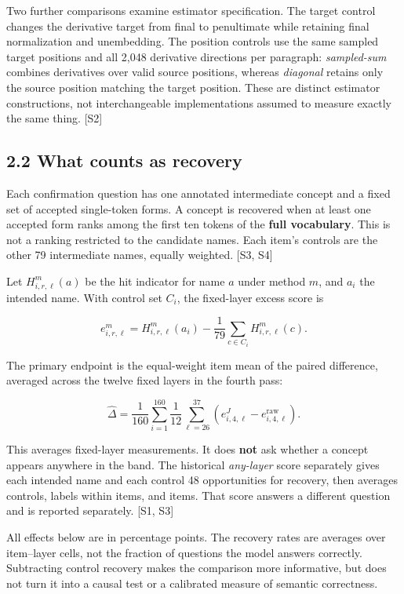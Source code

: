 \documentclass[
  11pt,
  a4paper,
]{article}
\begin{document}
Two further comparisons examine estimator specification. The target
control changes the derivative target from final to penultimate while
retaining final normalization and unembedding. The position controls use
the same sampled target positions and all 2,048 derivative directions
per paragraph: \emph{sampled-sum} combines derivatives over valid source
positions, whereas \emph{diagonal} retains only the source position
matching the target position. These are distinct estimator
constructions, not interchangeable implementations assumed to measure
exactly the same thing. {[}S2{]}

\subsection{2.2 What counts as recovery}\label{what-counts-as-recovery}

Each confirmation question has one annotated intermediate concept and a
fixed set of accepted single-token forms. A concept is recovered when at
least one accepted form ranks among the first ten tokens of the
\textbf{full vocabulary}. This is not a ranking restricted to the
candidate names. Each item's controls are the other 79 intermediate
names, equally weighted. {[}S3, S4{]}

Let \(H_{i,r,\ell}^{m}(a)\) be the hit indicator for name \(a\) under
method \(m\), and \(a_i\) the intended name. With control set \(C_i\),
the fixed-layer excess score is

\[
e_{i,r,\ell}^{m}=H_{i,r,\ell}^{m}(a_i)
-\frac{1}{79}\sum_{c\in C_i}H_{i,r,\ell}^{m}(c).
\]

The primary endpoint is the equal-weight item mean of the paired
difference, averaged across the twelve fixed layers in the fourth pass:

\[
\widehat{\Delta}
=\frac{1}{160}\sum_{i=1}^{160}\frac{1}{12}
\sum_{\ell=26}^{37}\left(e_{i,4,\ell}^{J}-e_{i,4,\ell}^{\mathrm{raw}}\right).
\]

This averages fixed-layer measurements. It does \textbf{not} ask whether
a concept appears anywhere in the band. The historical \emph{any-layer}
score separately gives each intended name and each control 48
opportunities for recovery, then averages controls, labels within items,
and items. That score answers a different question and is reported
separately. {[}S1, S3{]}

All effects below are in percentage points. The recovery rates are
averages over item--layer cells, not the fraction of questions the model
answers correctly. Subtracting control recovery makes the comparison
more informative, but does not turn it into a causal test or a
calibrated measure of semantic correctness.
\end{document}
